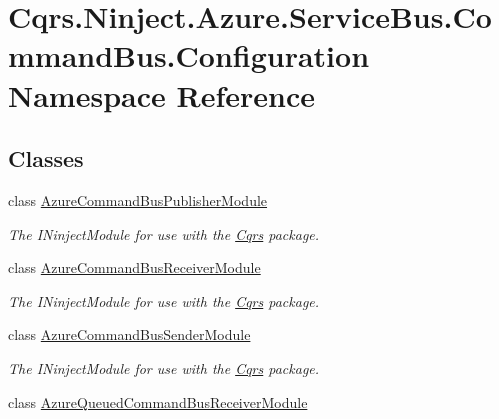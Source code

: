 \hypertarget{namespaceCqrs_1_1Ninject_1_1Azure_1_1ServiceBus_1_1CommandBus_1_1Configuration}{}\section{Cqrs.\+Ninject.\+Azure.\+Service\+Bus.\+Command\+Bus.\+Configuration Namespace Reference}
\label{namespaceCqrs_1_1Ninject_1_1Azure_1_1ServiceBus_1_1CommandBus_1_1Configuration}
\subsection*{Classes}
\begin{DoxyCompactItemize}
\item 
class \hyperlink{classCqrs_1_1Ninject_1_1Azure_1_1ServiceBus_1_1CommandBus_1_1Configuration_1_1AzureCommandBusPublisherModule}{Azure\+Command\+Bus\+Publisher\+Module}
\begin{DoxyCompactList}\small\item\em The I\+Ninject\+Module for use with the \hyperlink{namespaceCqrs}{Cqrs} package. \end{DoxyCompactList}\item 
class \hyperlink{classCqrs_1_1Ninject_1_1Azure_1_1ServiceBus_1_1CommandBus_1_1Configuration_1_1AzureCommandBusReceiverModule}{Azure\+Command\+Bus\+Receiver\+Module}
\begin{DoxyCompactList}\small\item\em The I\+Ninject\+Module for use with the \hyperlink{namespaceCqrs}{Cqrs} package. \end{DoxyCompactList}\item 
class \hyperlink{classCqrs_1_1Ninject_1_1Azure_1_1ServiceBus_1_1CommandBus_1_1Configuration_1_1AzureCommandBusSenderModule}{Azure\+Command\+Bus\+Sender\+Module}
\begin{DoxyCompactList}\small\item\em The I\+Ninject\+Module for use with the \hyperlink{namespaceCqrs}{Cqrs} package. \end{DoxyCompactList}\item 
class \hyperlink{classCqrs_1_1Ninject_1_1Azure_1_1ServiceBus_1_1CommandBus_1_1Configuration_1_1AzureQueuedCommandBusReceiverModule}{Azure\+Queued\+Command\+Bus\+Receiver\+Module}
\end{DoxyCompactItemize}

